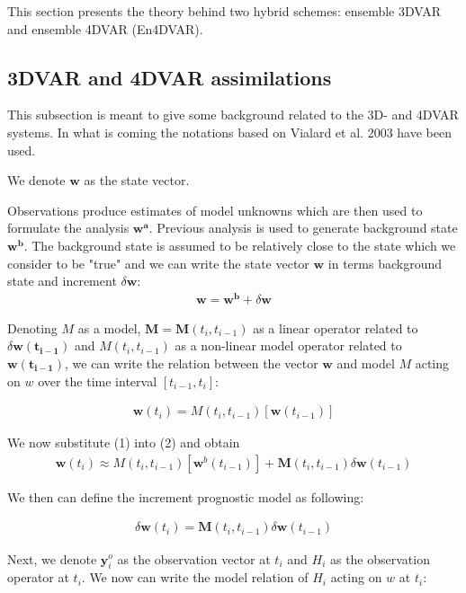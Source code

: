 \documentclass[a4,12pt]{article}
\numberwithin{equation}{section}
\begin{document}
This section presents the theory behind two hybrid schemes: ensemble 3DVAR and ensemble 4DVAR (En4DVAR). 

\subsection{3DVAR and 4DVAR assimilations}
This subsection is meant to give some background related to the 3D- and 4DVAR systems. In what is coming the notations based on Vialard et al. 2003 have been used.

We denote $\mathbf{w}$ as the state vector. 

Observations produce estimates of model unknowns which are then used to formulate the analysis $\mathbf{w^{a}}$. Previous analysis is used to generate background state $\mathbf{w^b}$. The background state is assumed to be relatively close to the state which we consider to be "true" and we can write the state vector $\mathbf {w}$ in terms background state and increment $\delta \mathbf {w}$:
\begin{align}
\mathbf{w} = \mathbf {w^{b}}+\delta \mathbf {w}
\end{align} 

Denoting $M$ as a model, $\mathbf {M} = \mathbf {M}(t_{i}, t_{i-1})$ as a linear operator related to $\delta \mathbf {w(t_{i-1})}$ and $M(t_{i},t_{i-1})$ as a non-linear model operator related to $\mathbf {w(t_{i-1})}$, we can write the relation between the vector $\mathbf {w}$ and model $M$ acting on $w$ over the time interval $[t_{i-1},t_{i}]$:

\begin{align}
\mathbf {w}(t_{i})=M(t_{i},t_{i-1})[\mathbf {w}(t_{i-1})]
\end{align}

We now substitute (1) into (2) and obtain 
\begin{align}
\mathbf {w}(t_{i}) \approx M(t_{i},t_{i-1})[\mathbf {w}^{b}(t_{i-1})] + \mathbf {M}(t_{i},t_{i-1})\delta \mathbf {w}(t_{i-1})
\end{align}

We then can define the increment prognostic model as following:

\begin{align}
\delta \mathbf {w}(t_{i}) = \mathbf {M}(t_{i},t_{i-1})\delta \mathbf {w}(t_{i-1})
\end{align}

Next, we denote $\mathbf {y}_{i}^{o}$ as the observation vector at $t_{i}$ and $H_{i}$ as the observation operator at $t_{i}$. We now can write the model relation of $H_{i}$ acting on $w$ at $t_{i}$:
\end{document}
